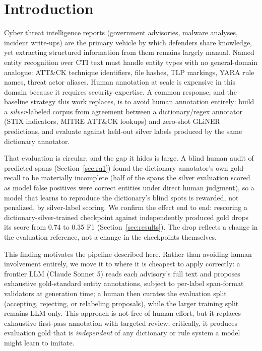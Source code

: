 \documentclass[11pt]{article}
\begin{document}
\section{Introduction}

Cyber threat intelligence reports (government advisories, malware analyses,
incident write-ups) are the primary vehicle by which defenders share
knowledge, yet extracting structured information from them remains largely
manual. Named entity recognition over CTI text must handle entity types with
no general-domain analogue: ATT\&CK technique identifiers, file hashes, TLP
markings, YARA rule names, threat actor aliases. Human annotation at scale is
expensive in this domain because it requires security expertise. A common
response, and the baseline strategy this work replaces, is to avoid human
annotation entirely: build a \emph{silver}-labeled corpus from agreement
between a dictionary/regex annotator (STIX indicators, MITRE ATT\&CK
lookups) and zero-shot GLiNER \citep{zaratiana2024gliner} predictions, and
evaluate against held-out silver labels produced by the same dictionary
annotator.

That evaluation is circular, and the gap it hides is large. A blind human
audit of predicted spans (Section~\ref{sec:rq1}) found the dictionary
annotator's own gold-recall to be materially incomplete (half of the spans
the silver evaluation scored as model false positives were correct entities
under direct human judgment), so a model that learns to reproduce the
dictionary's blind spots is rewarded, not penalized, by silver-label
scoring. We confirm the effect end to end: rescoring a
dictionary-silver-trained checkpoint against independently produced gold
drops its score from 0.74 to 0.35 F1 (Section~\ref{sec:results}). The
drop reflects a change in the evaluation reference, not a change in the
checkpoints themselves.

This finding motivates the pipeline described here. Rather than avoiding
human involvement entirely, we move it to where it is cheapest to apply
correctly: a frontier LLM (Claude Sonnet 5) reads each advisory's full text and
proposes exhaustive gold-standard entity annotations, subject to per-label
span-format validators at generation time; a human then curates the
evaluation split (accepting, rejecting, or relabeling proposals), while the
larger training split remains LLM-only. This approach is not free of human
effort, but it replaces exhaustive first-pass annotation with targeted
review; critically, it produces evaluation gold that is
\emph{independent} of any dictionary or rule system a model might learn to
imitate.
\end{document}
